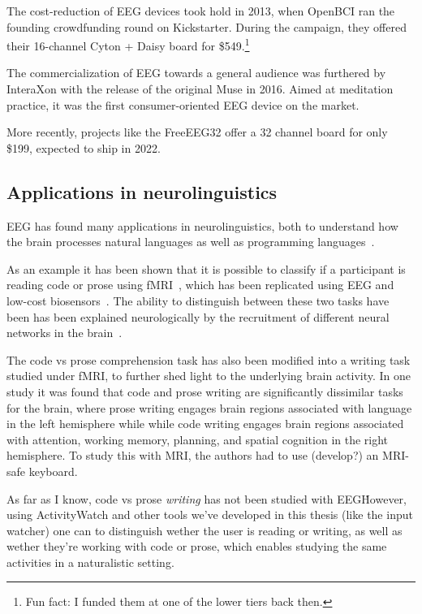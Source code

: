     The cost-reduction of EEG devices took hold in 2013, when OpenBCI ran the founding crowdfunding round on Kickstarter. During the campaign, they offered their 16-channel Cyton + Daisy board for \$549.\footnote{Fun fact: I funded them at one of the lower tiers back then.}\cite{noauthor_openbci_nodate}

    The commercialization of EEG towards a general audience was furthered by InteraXon with the release of the original Muse in 2016. Aimed at meditation practice, it was the first consumer-oriented EEG device on the market.

    More recently, projects like the FreeEEG32 offer a 32 channel board for only \$199, expected to ship in 2022.\cite{noauthor_freeeeg32_nodate}

    \subsection{Applications in neurolinguistics}

        EEG has found many applications in neurolinguistics, both to understand how the brain processes natural languages as well as programming languages~\cite{prat_relating_2020}.

         As an example it has been shown that it is possible to classify if a participant is reading code or prose using fMRI~\cite{floyd_decoding_2017}, which has been replicated using EEG and low-cost biosensors~\cite{fucci_replication_2019}. The ability to distinguish between these two tasks have been has been explained neurologically by the recruitment of different neural networks in the brain~\cite{ivanova_comprehension_2020}.

        The code vs prose comprehension task has also been modified into a writing task studied under fMRI, to further shed light to the underlying brain activity. In one study it was found that code and prose writing are significantly dissimilar tasks for the brain, where prose writing engages brain regions associated with language in the left hemisphere while while code writing engages brain regions associated with attention, working memory, planning, and spatial cognition in the right hemisphere\cite{noauthor_neurological_nodate}. To study this with MRI, the authors had to use (develop?) an MRI-safe keyboard.

        As far as I know, code vs prose \emph{writing} has not been studied with EEG\. However, using ActivityWatch and other tools we've developed in this thesis (like the input watcher) one can to distinguish wether the user is reading or writing, as well as wether they're working with code or prose, which enables studying the same activities in a naturalistic setting.

